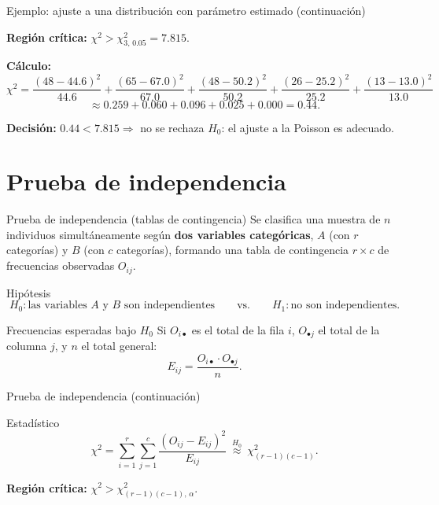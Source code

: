 \documentclass[aspectratio=169,11pt]{beamer}
\begin{document}
\begin{frame}{Ejemplo: ajuste a una distribución con parámetro estimado (continuación)}
\begin{example}
\textbf{Región crítica:} $\chi^2>\chi^2_{3,\,0.05}=7.815$.

\textbf{Cálculo:}
\[
\chi^2=\frac{(48-44.6)^2}{44.6}+\frac{(65-67.0)^2}{67.0}+\frac{(48-50.2)^2}{50.2}+\frac{(26-25.2)^2}{25.2}+\frac{(13-13.0)^2}{13.0}
\]
\[
\approx0.259+0.060+0.096+0.025+0.000=0.44.
\]

\textbf{Decisión:} $0.44<7.815\Rightarrow$ no se rechaza $H_0$: el ajuste a la Poisson es adecuado.
\end{example}
\end{frame}

\section{Prueba de independencia}

\begin{frame}{Prueba de independencia (tablas de contingencia)}
Se clasifica una muestra de $n$ individuos simultáneamente según \textbf{dos variables categóricas}, $A$ (con $r$ categorías) y $B$ (con $c$ categorías), formando una tabla de contingencia $r\times c$ de frecuencias observadas $O_{ij}$.

\begin{block}{Hipótesis}
\[
H_0: \text{las variables } A \text{ y } B \text{ son independientes} \qquad \text{vs.} \qquad H_1: \text{no son independientes}.
\]
\end{block}

\begin{block}{Frecuencias esperadas bajo $H_0$}
Si $O_{i\bullet}$ es el total de la fila $i$, $O_{\bullet j}$ el total de la columna $j$, y $n$ el total general:
\[
E_{ij} = \frac{O_{i\bullet}\cdot O_{\bullet j}}{n}.
\]
\end{block}

\end{frame}

\begin{frame}{Prueba de independencia (continuación)}
\begin{block}{Estadístico}
\[
\chi^2=\sum_{i=1}^{r}\sum_{j=1}^{c}\frac{(O_{ij}-E_{ij})^2}{E_{ij}} \ \overset{H_0}{\approx}\ \chi^2_{(r-1)(c-1)}.
\]
\end{block}
\textbf{Región crítica:} $\chi^2>\chi^2_{(r-1)(c-1),\,\alpha}$.
\end{frame}
\end{document}
